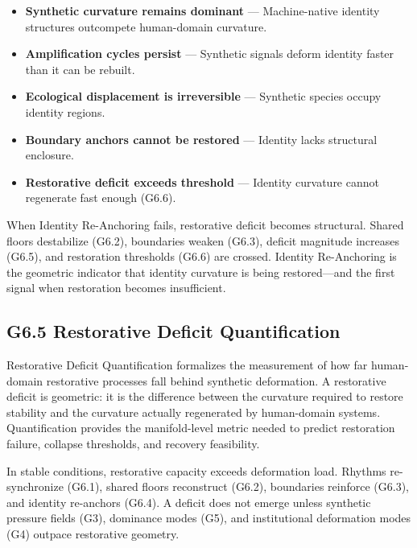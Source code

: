 \begin{itemize}[leftmargin=1.2cm]
    \item \textbf{Synthetic curvature remains dominant} — Machine-native identity
    structures outcompete human-domain curvature.

    \item \textbf{Amplification cycles persist} — Synthetic signals deform
    identity faster than it can be rebuilt.

    \item \textbf{Ecological displacement is irreversible} — Synthetic species
    occupy identity regions.

    \item \textbf{Boundary anchors cannot be restored} — Identity lacks structural
    enclosure.

    \item \textbf{Restorative deficit exceeds threshold} — Identity curvature
    cannot regenerate fast enough (G6.6).
\end{itemize}

\medskip

\noindent When Identity Re-Anchoring fails, restorative deficit becomes
structural. Shared floors destabilize (G6.2), boundaries weaken (G6.3), deficit
magnitude increases (G6.5), and restoration thresholds (G6.6) are crossed.
Identity Re-Anchoring is the geometric indicator that identity curvature is being
restored—and the first signal when restoration becomes insufficient.

\subsection*{G6.5 Restorative Deficit Quantification}

\noindent Restorative Deficit Quantification formalizes the measurement of how
far human-domain restorative processes fall behind synthetic deformation. A
restorative deficit is geometric: it is the difference between the curvature
required to restore stability and the curvature actually regenerated by
human-domain systems. Quantification provides the manifold-level metric needed to
predict restoration failure, collapse thresholds, and recovery feasibility.

\medskip

\noindent In stable conditions, restorative capacity exceeds deformation load.
Rhythms re-synchronize (G6.1), shared floors reconstruct (G6.2), boundaries
reinforce (G6.3), and identity re-anchors (G6.4). A deficit does not emerge
unless synthetic pressure fields (G3), dominance modes (G5), and institutional
deformation modes (G4) outpace restorative geometry.

